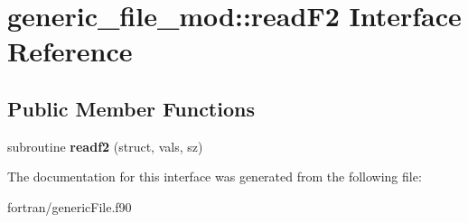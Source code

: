 \hypertarget{interfacegeneric__file__mod_1_1read_f2}{}\section{generic\+\_\+file\+\_\+mod\+:\+:read\+F2 Interface Reference}
\label{interfacegeneric__file__mod_1_1read_f2}
\subsection*{Public Member Functions}
\begin{DoxyCompactItemize}
\item 
\mbox{\label{interfacegeneric__file__mod_1_1read_f2_a73b9da9bb9f10694aedf569b0c82c11c}} 
subroutine {\bfseries readf2} (struct, vals, sz)
\end{DoxyCompactItemize}


The documentation for this interface was generated from the following file\+:\begin{DoxyCompactItemize}
\item 
fortran/generic\+File.\+f90\end{DoxyCompactItemize}
